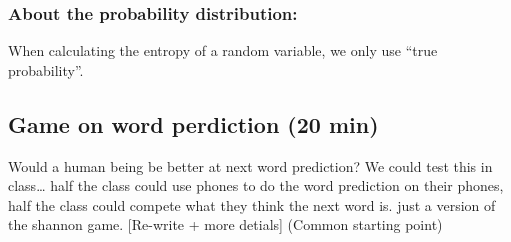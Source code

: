 \documentclass[12pt]{article}
\theoremstyle{definition}
\theoremstyle{plain}
\begin{document}
\subsubsection{About the probability distribution:}
When calculating the entropy of a random variable, we only use ``true
probability''.



\subsection{Game on word perdiction (20 min)}
Would a human being be better at next word prediction?  We could test this in
class…  half the class could use phones to do the word prediction on their
phones, half the class could compete what they think the next word is.  just a
version of the shannon game. [Re-write + more detials]
(Common starting point)



\end{document}
